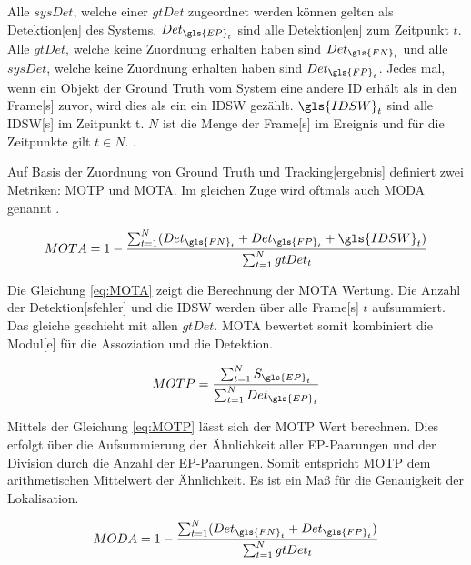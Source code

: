 Alle \(sysDet\), welche einer \(gtDet\) zugeordnet werden können gelten als  \gls{Detektion}[en] des Systems. \(Det_{\gls{EP}_t}\) sind alle  \gls{Detektion}[en] zum Zeitpunkt \(t\). Alle \(gtDet\), welche keine Zuordnung erhalten haben sind  \(Det_{\gls{FN}_t}\) und alle \(sysDet\), welche keine Zuordnung erhalten haben sind  \(Det_{\gls{FP}_t}\). Jedes mal, wenn ein Objekt der \gls{Ground Truth} vom System eine andere \acrshort{ID} erhält als in den \gls{Frame}[s] zuvor, wird dies als ein ein \gls{IDSW} gezählt. \(\gls{IDSW}_t\) sind alle \gls{IDSW}[s] im Zeitpunkt t. \(N\) ist die Menge der \gls{Frame}[s] im \gls{Ereignis} und für die Zeitpunkte gilt \(t \in N\). \cite{CLEAR.2008, IDF1}. \par

Auf Basis der Zuordnung von \gls{Ground Truth} und \gls{Tracking}[ergebnis] definiert \cite{CLEAR.2008} zwei Metriken: \gls{MOTP} und \gls{MOTA}. Im gleichen Zuge wird oftmals auch \gls{MODA} genannt \cite{Kasturi.2009}. 

\begin{equation}
    \label{eq:MOTA}
    MOTA = 1-\frac{\sum_{t=1}^{N} (Det_{\gls{FN}_{t}}+Det_{\gls{FP}_{t}}+\gls{IDSW}_{t})}{\sum_{t=1}^{N}gtDet_t}
\end{equation}

Die Gleichung \ref{eq:MOTA} zeigt die Berechnung der \gls{MOTA} Wertung. Die Anzahl der \gls{Detektion}[sfehler] und die \gls{IDSW} werden über alle \gls{Frame}[s] \(t\) aufsummiert. Das gleiche geschieht mit allen \(gtDet\). \gls{MOTA} bewertet somit kombiniert die \gls{Modul}[e] für die \gls{Assoziation} und die \gls{Detektion}. 

\begin{equation}
    \label{eq:MOTP}
    MOTP = \frac{\sum_{t=1}^{N}S_{\gls{EP}_t}}{\sum_{t=1}^{N}Det_{\gls{EP}_t}}
\end{equation}

Mittels der Gleichung \ref{eq:MOTP} lässt sich der \gls{MOTP} Wert berechnen. Dies erfolgt über die Aufsummierung der Ähnlichkeit aller \gls{EP}-Paarungen und der Division durch die Anzahl der \gls{EP}-Paarungen. Somit entspricht \gls{MOTP} dem arithmetischen Mittelwert der Ähnlichkeit. Es ist ein Maß für die Genauigkeit der \gls{Lokalisation}.

\begin{equation}
    \label{eq:MODA}
    MODA =  1- \frac{\sum_{t=1}^{N} (Det_{\gls{FN}_{t}}+Det_{\gls{FP}_{t}})}{\sum_{t=1}^{N}gtDet_t}
\end{equation}

